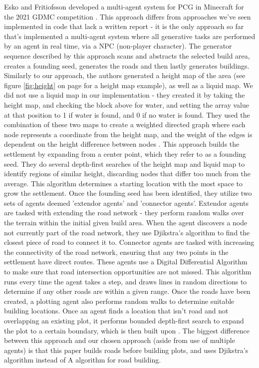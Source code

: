 \documentclass[11pt, oneside]{article}
\begin{document}
\begin{normalsize}
Esko and Fritiofsson developed a multi-agent system for PCG in Minecraft for the 2021 GDMC competition \cite{esko2021multi}. This approach differs from approaches we've seen implemented in code that lack a written report - it is the only approach so far that's implemented a multi-agent system where all generative tasks are performed by an agent in real time, via a NPC (non-player character). The generator sequence described by this approach scans and abstracts the selected build area, creates a founding seed, generates the roads and then lastly generates buildings. Similarly to our approach, the authors generated a height map of the area (see figure \ref{fig:height} on page \pageref{fig:height} for a height map example), as well as a liquid map. We did not use a liquid map in our implementation - they created it by taking the height map, and checking the block above for water, and setting the array value at that position to 1 if water is found, and 0 if no water is found. They used the combination of these two maps to create a weighted directed graph where each node represents a coordinate from the height map, and the weight of the edges is dependent on the height difference between nodes \cite{esko2021multi}. This approach builds the settlement by expanding from a center point, which they refer to as a founding seed. They do several depth-first searches of the height map and liquid map to identify regions of similar height, discarding nodes that differ too much from the average. This algorithm determines a starting location with the most space to grow the settlement. Once the founding seed has been identified, they utilize two sets of agents deemed 'extendor agents' and 'connector agents'. Extendor agents are tasked with extending the road network - they perform random walks over the terrain within the initial given build area. When the agent discovers a node not currently part of the road network, they use Djikstra's algorithm to find the closest piece of road to connect it to. Connector agents are tasked with increasing the connectivity of the road network, ensuring that any two points in the settlement have direct routes. These agents use a Digital Differential Algorithm to make sure that road intersection opportunities are not missed. This algorithm runs every time the agent takes a step, and draws lines in random directions to determine if any other roads are within a given range. Once the roads have been created, a plotting agent also performs random walks to determine suitable building locations. Once an agent finds a location that isn't road and not overlapping an existing plot, it performs bounded depth-first search to expand the plot to a certain boundary, which is then built upon \cite{esko2021multi}. The biggest difference between this approach and our chosen approach (aside from use of multiple agents) is that this paper builds roads before building plots, and uses Djikstra's algorithm instead of A\* algorithm for road building.


\end{normalsize}
\end{document}
